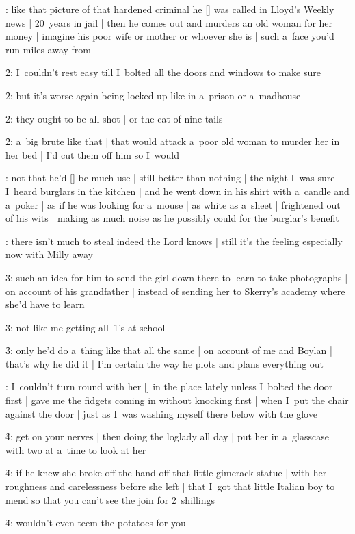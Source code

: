 :
like that picture of that hardened criminal
he [\criminal] was called in Lloyd's Weekly news |
20~years in jail |
then he comes out and murders an old woman for her money |
imagine his poor wife or mother or whoever she is |
such a~face you'd run miles away from

\f2:
I~couldn't rest easy till I~bolted all the doors and windows to make sure

\f2:
but it's worse again being locked up like in a~prison or a~madhouse

\f2:
they ought to be all shot |
or the cat of nine tails

\f2:
a~big brute like that |
that would attack a~poor old woman to murder her in her bed |
I'd cut them off him so I~would

:
not that he'd [\bloom] be much use |
still better than nothing |
the night I~was sure I~heard burglars in the kitchen |
and he went down in his shirt with a~candle and a~poker |
as if he was looking for a~mouse |
as white as a~sheet |
frightened out of his wits |
making as much noise as he possibly could for the burglar's benefit

:
there isn't much to steal indeed the Lord knows |
still it's the feeling especially now with Milly away

\f3:
such an idea for him to send the girl down there to learn to take photographs |
on account of his grandfather |
instead of sending her to Skerry's academy where she'd have to learn

\f3:
not like me getting all~1's at school

\f3:
only he'd do a~thing like that all the same |
on account of me and Boylan |
that's why he did it |
I'm certain the way he plots and plans everything out

:
I~couldn't turn round with her [\milly] in the place lately
unless I~bolted the door first |
gave me the fidgets coming in without knocking first |
when I~put the chair against the door |
just as I~was washing myself there below with the glove

\f4:
get on your nerves |
then doing the loglady all day |
put her in a~glasscase with two at a~time to look at her

\f4:
if he knew she broke off the hand off that little gimcrack statue |
with her roughness and carelessness before she left |
that I~got that little Italian boy to mend so that you can't see the join for 2~shillings

\f4:
wouldn't even teem the potatoes for you

